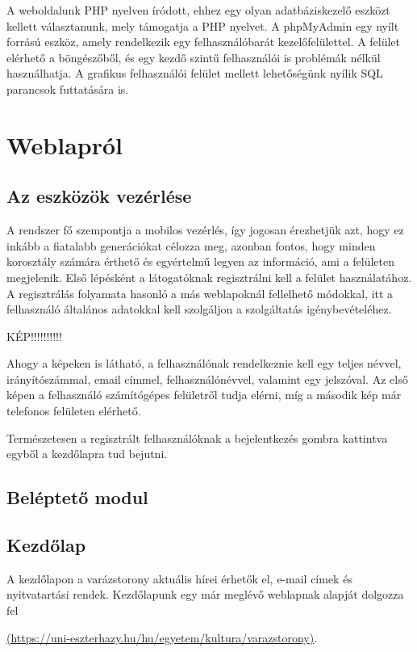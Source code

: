 \documentclass[
]{thesis-ekf}
\theoremstyle{definition}
\theoremstyle{remark}
\begin{document}
	
	A weboldalunk PHP nyelven íródott, ehhez egy olyan adatbáziskezelő eszközt kellett választanunk, mely támogatja a PHP nyelvet. A phpMyAdmin egy nyílt forrású eszköz, amely rendelkezik egy felhasználóbarát kezelőfelülettel. A felület elérhető a böngészőből, és egy kezdő szintű felhasználói is problémák nélkül használhatja. A grafikus felhasználói felület mellett lehetőségünk nyílik SQL parancsok futtatására is. 
	
	\section{Weblapról}
		\subsection{Az eszközök vezérlése}
			A rendszer fő szempontja a mobilos vezérlés, így jogosan érezhetjük azt, hogy ez inkább a fiatalabb generációkat célozza meg, azonban fontos, hogy minden korosztály számára érthető és egyértelmű legyen az információ, ami a felületen megjelenik.
			Első lépésként a látogatóknak regisztrálni kell a felület használatához. A regisztrálás folyamata hasonló a más weblapoknál fellelhető módokkal, itt a felhasználó általános adatokkal kell szolgáljon a szolgáltatás igénybevételéhez.
			
			
			\par KÉP!!!!!!!!!!
			
			\par Ahogy a képeken is látható, a felhasználónak rendelkeznie kell egy teljes névvel, irányítószámmal, email címmel, felhasználónévvel, valamint egy jelszóval. Az első képen a felhasználó számítógépes felületről tudja elérni, míg a második kép már telefonos felületen elérhető.
			\par Természetesen a regisztrált felhasználóknak a bejelentkezés gombra kattintva egyből a kezdőlapra tud bejutni.
			
			
			
		\subsection{Beléptető modul}
		\subsection{Kezdőlap}
			A kezdőlapon a varázstorony aktuális hírei érhetők el, e-mail címek és nyitvatartási rendek. Kezdőlapunk egy már meglévő weblapnak alapját dolgozza fel
			\par \url{(https://uni-eszterhazy.hu/hu/egyetem/kultura/varazstorony)}.
\end{document}
